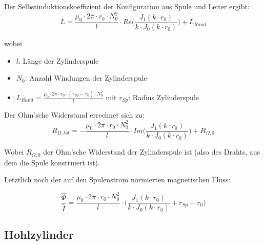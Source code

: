 Der Selbstinduktionskoeffizient der Konfiguration aus Spule und Leiter ergibt:
\begin{equation}
    \label{eq:vollzylinder:LExact}
    L = \frac{\mu_0 \cdot 2\pi \cdot r_0 \cdot N_0^2}{l} \cdot Re \Biggl(\frac{J_1 (k \cdot r_0)}{k \cdot J_0 (k \cdot r_0)} \Biggr) + L_{Rand}
\end{equation}

wobei
\begin{itemize}
    \item[]
        $l$: L\"ange der Zylinderspule
    \item[]
        $N_0$: Anzahl Windungen der Zylinderspule
    \item[]
        $L_{Rand} = \frac{\mu_0 \cdot 2\pi \cdot r_0 \cdot (r_{Sp} - r_0) \cdot N_0^2}{l}$ mit $r_{Sp}$: Radius Zylinderspule
\end{itemize}

Der Ohm'sche Widerstand errechnet sich zu:
\begin{equation}
    \label{eq:vollzylinder:RExact}
    R_{\Omega,tot} = - \frac{\mu_0 \cdot 2\pi \cdot r_0 \cdot N_0^2}{l} \cdot Im \Biggl(\frac{J_1 (k \cdot r_0)}{k \cdot J_0 (k \cdot r_0)} \Biggr) + R_{\Omega,0}
\end{equation}

Wobei $R_{\Omega,0}$ der  Ohm'sche Widerstand der Zylinderspule  ist (also des
Drahts, aus dem die Spule konstruiert ist).

Letztlich noch der auf den Spulenstrom normierten magnetischen Fluss:

\begin{equation}
    \label{eq:vollzylinder:phiExact}
    \frac{\hat{\Phi}}{\hat{I}} = \frac{\mu_0 \cdot 2\pi \cdot r_0 \cdot N_0^2}{l} \cdot \Biggl(\frac{J_1 (k \cdot r_0)}{k \cdot J_0 (k \cdot r_0)} + r_{Sp} - r_0 \Biggr)
\end{equation}


\subsection{Hohlzylinder}
\label{sec:arbgru:subsec:hohlzyliner}


